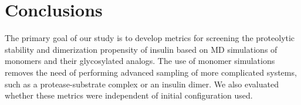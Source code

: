 \documentclass[9pt]{elife}
\begin{document}


\section{Conclusions}
The primary goal of our study is to develop metrics for screening the proteolytic stability and dimerization propensity of insulin based on MD simulations of monomers and their glycosylated analogs. The use of monomer simulations removes the need of performing advanced sampling of more complicated systems, such as a protease-substrate complex or an insulin dimer. We also evaluated whether these metrics were independent of initial configuration used. 
\end{document}

